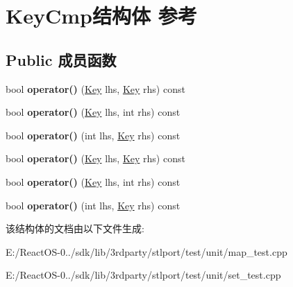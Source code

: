 \hypertarget{struct_key_cmp}{}\section{Key\+Cmp结构体 参考}
\label{struct_key_cmp}
\subsection*{Public 成员函数}
\begin{DoxyCompactItemize}
\item 
\mbox{\label{struct_key_cmp_a2f447ea43b6a612f52e06439b586bcae}} 
bool {\bfseries operator()} (\hyperlink{struct_key}{Key} lhs, \hyperlink{struct_key}{Key} rhs) const
\item 
\mbox{\label{struct_key_cmp_aa76a18b8edabff87a35694f615073495}} 
bool {\bfseries operator()} (\hyperlink{struct_key}{Key} lhs, int rhs) const
\item 
\mbox{\label{struct_key_cmp_aaa21961c8ec4d83aa8f0bcadefb961e4}} 
bool {\bfseries operator()} (int lhs, \hyperlink{struct_key}{Key} rhs) const
\item 
\mbox{\label{struct_key_cmp_a2f447ea43b6a612f52e06439b586bcae}} 
bool {\bfseries operator()} (\hyperlink{struct_key}{Key} lhs, \hyperlink{struct_key}{Key} rhs) const
\item 
\mbox{\label{struct_key_cmp_aa76a18b8edabff87a35694f615073495}} 
bool {\bfseries operator()} (\hyperlink{struct_key}{Key} lhs, int rhs) const
\item 
\mbox{\label{struct_key_cmp_aaa21961c8ec4d83aa8f0bcadefb961e4}} 
bool {\bfseries operator()} (int lhs, \hyperlink{struct_key}{Key} rhs) const
\end{DoxyCompactItemize}


该结构体的文档由以下文件生成\+:\begin{DoxyCompactItemize}
\item 
E\+:/\+React\+O\+S-\/0../sdk/lib/3rdparty/stlport/test/unit/map\+\_\+test.\+cpp\item 
E\+:/\+React\+O\+S-\/0../sdk/lib/3rdparty/stlport/test/unit/set\+\_\+test.\+cpp\end{DoxyCompactItemize}
